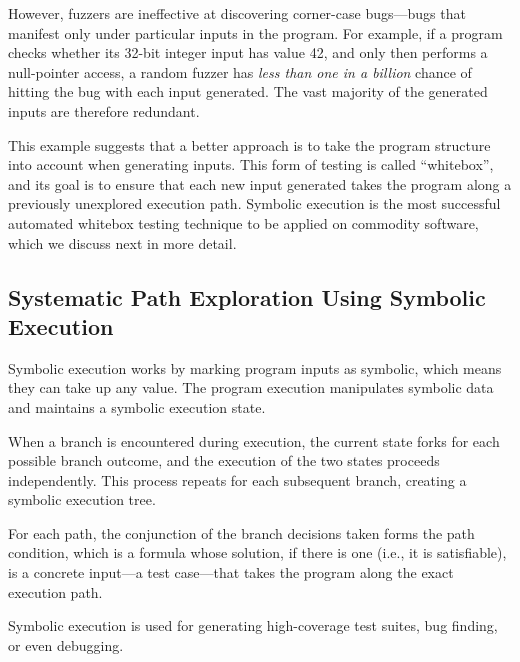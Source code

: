 
However, fuzzers are ineffective at discovering corner-case bugs---bugs that manifest only under particular inputs in the program.
%
For example, if a program checks whether its 32-bit integer input has value 42, and only then performs a null-pointer access, a random fuzzer has \emph{less than one in a billion} chance of hitting the bug with each input generated.
%
The vast majority of the generated inputs are therefore redundant.



This example suggests that a better approach is to take the program structure into account when generating inputs.  This form of testing is called ``whitebox'', and its goal is to ensure that each new input generated takes the program along a previously unexplored execution path.
%
Symbolic execution is the most successful automated whitebox testing technique to be applied on commodity software, which we discuss next in more detail.

\subsection{Systematic Path Exploration Using Symbolic Execution}

Symbolic execution works by marking program inputs as symbolic, which means they can take up any value.  The program execution manipulates symbolic data and maintains a symbolic execution state.

When a branch is encountered during execution, the current state forks for each possible branch outcome, and the execution of the two states proceeds independently.  This process repeats for each subsequent branch, creating a symbolic execution tree.

For each path, the conjunction of the branch decisions taken forms the path condition, which is a formula whose solution, if there is one (i.e., it is satisfiable), is a concrete input---a test case---that takes the program along the exact execution path.

Symbolic execution is used for generating high-coverage test suites, bug finding, or even debugging.

